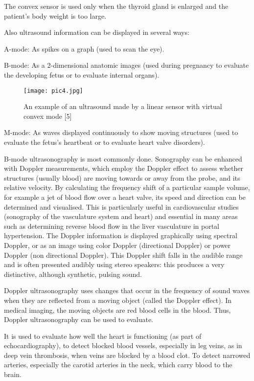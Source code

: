 \documentclass[10pt, twocolumn, a4paper]{article}
\begin{document}
The convex sensor is used only when the thyroid gland is enlarged and the patient’s body weight is too large.

Also ultrasound information can be displayed in several ways:

A-mode: As spikes on a graph (used to scan the eye).

B-mode: As a 2-dimensional anatomic images (used during pregnancy to evaluate the developing fetus or to evaluate internal organs).

\begin{figure}[h!]
    \centering
    \texttt{[image: pic4.jpg]}
    \caption{An example of an ultrasound made by a linear sensor with virtual convex mode [5]}
    \label{fig:figure4}
\end{figure}

M-mode: As waves displayed continuously to show moving structures (used to evaluate the fetus’s heartbeat or to evaluate heart valve disorders).

B-mode ultrasonography is most commonly done. Sonography can be enhanced with Doppler measurements, which employ the Doppler effect to assess whether structures (usually blood) are moving towards or away from the probe, and its relative velocity. By calculating the frequency shift of a particular sample volume, for example a jet of blood flow over a heart valve, its speed and direction can be determined and visualised. This is particularly useful in cardiovascular studies (sonography of the vasculature system and heart) and essential in many areas such as determining reverse blood flow in the liver vasculature in portal hypertension. The Doppler information is displayed graphically using spectral Doppler, or as an image using color Doppler (directional Doppler) or power Doppler (non directional Doppler). This Doppler shift falls in the audible range and is often presented audibly using stereo speakers: this produces a very distinctive, although synthetic, pulsing sound.

Doppler ultrasonography uses changes that occur in the frequency of sound waves when they are reflected from a moving object (called the Doppler effect). In medical imaging, the moving objects are red blood cells in the blood. Thus, Doppler ultrasonography can be used to evaluate.

It is used to evaluate how well the heart is functioning (as part of echocardiography), to detect blocked blood vessels, especially in leg veins, as in deep vein thrombosis, when veins are blocked by a blood clot. To detect narrowed arteries, especially the carotid arteries in the neck, which carry blood to the brain.
\end{document}
